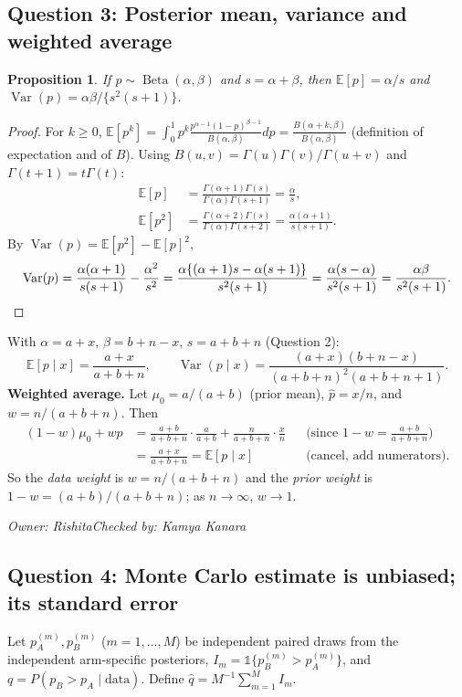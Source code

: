 \documentclass[11pt]{article}
\newtheorem{proposition}{Proposition}
\newcommand{\signoff}[2]{\par\smallskip\noindent\textit{Owner: #1\quad Checked by: #2}\par}
\newcommand{\E}{\mathbb{E}}
\newcommand{\Var}{\operatorname{Var}}
\newcommand{\Beta}{\operatorname{Beta}}
\begin{document}
\subsection{Question 3: Posterior mean, variance and weighted average}
\begin{proposition}
If $p\sim\Beta(\alpha,\beta)$ and $s=\alpha+\beta$, then $\E[p]=\alpha/s$ and $\Var(p)=\alpha\beta/\{s^2(s+1)\}$.
\end{proposition}
\begin{proof}
For $k\ge0$, $\E[p^k]=\int_0^1p^k\frac{p^{\alpha-1}(1-p)^{\beta-1}}{B(\alpha,\beta)}dp=\frac{B(\alpha+k,\beta)}{B(\alpha,\beta)}$ (definition of expectation and of $B$). Using $B(u,v)=\Gamma(u)\Gamma(v)/\Gamma(u+v)$ and $\Gamma(t+1)=t\Gamma(t)$:
\begin{align*}
\E[p]&=\frac{\Gamma(\alpha+1)\Gamma(s)}{\Gamma(\alpha)\Gamma(s+1)}=\frac{\alpha}{s},\\
\E[p^2]&=\frac{\Gamma(\alpha+2)\Gamma(s)}{\Gamma(\alpha)\Gamma(s+2)}=\frac{\alpha(\alpha+1)}{s(s+1)}.
\end{align*}
By $\Var(p)=\E[p^2]-\E[p]^2$,
\[
\Var(p)=\frac{\alpha(\alpha+1)}{s(s+1)}-\frac{\alpha^2}{s^2}
=\frac{\alpha\{(\alpha+1)s-\alpha(s+1)\}}{s^2(s+1)}
=\frac{\alpha(s-\alpha)}{s^2(s+1)}=\frac{\alpha\beta}{s^2(s+1)}.\qedhere
\]
\end{proof}
With $\alpha=a+x$, $\beta=b+n-x$, $s=a+b+n$ (Question 2):
\[
\E[p\mid x]=\frac{a+x}{a+b+n},\qquad
\Var(p\mid x)=\frac{(a+x)(b+n-x)}{(a+b+n)^2(a+b+n+1)}.
\]
\textbf{Weighted average.} Let $\mu_0=a/(a+b)$ (prior mean), $\hat p=x/n$, and $w=n/(a+b+n)$. Then
\begin{align*}
(1-w)\mu_0+w\hat p&=\frac{a+b}{a+b+n}\cdot\frac{a}{a+b}+\frac{n}{a+b+n}\cdot\frac{x}{n} &&\text{(since }1-w=\tfrac{a+b}{a+b+n})\\
&=\frac{a+x}{a+b+n}=\E[p\mid x] &&\text{(cancel, add numerators)}.
\end{align*}
So the \emph{data weight} is $w=n/(a+b+n)$ and the \emph{prior weight} is $1-w=(a+b)/(a+b+n)$; as $n\to\infty$, $w\to1$.
\signoff{Rishita}{Kamya Kanara}

\subsection{Question 4: Monte Carlo estimate is unbiased; its standard error}
Let $p_A^{(m)},p_B^{(m)}$ ($m=1,\dots,M$) be independent paired draws from the independent arm-specific posteriors, $I_m=\mathbb 1\{p_B^{(m)}>p_A^{(m)}\}$, and $q=P(p_B>p_A\mid\text{data})$. Define $\hat q=M^{-1}\sum_{m=1}^MI_m$.
\end{document}
